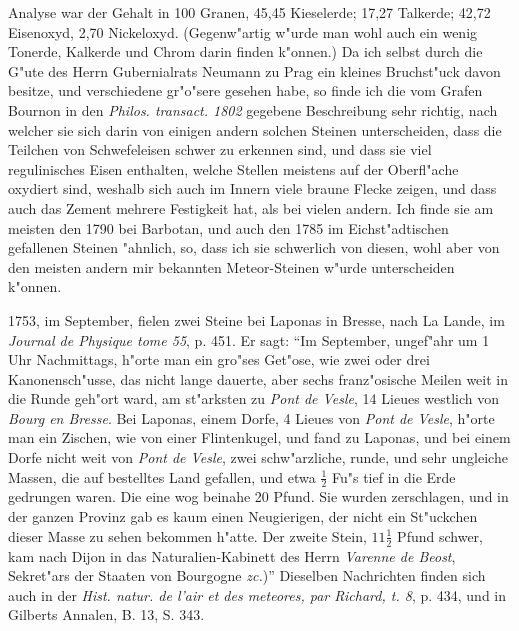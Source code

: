 \documentclass[a4paper, 11pt, oneside, polutonikogreek, german]{article}
\begin{document}
Analyse war der Gehalt in 100 Granen, 45,45 Kieselerde; 17,27 Talkerde; 42,72 Eisenoxyd, 2,70 Nickeloxyd. (Gegenw"artig w"urde man wohl auch ein wenig Tonerde, Kalkerde und Chrom darin finden k"onnen.) Da ich selbst durch die G"ute des Herrn Gubernialrats Neumann zu Prag ein kleines Bruchst"uck davon besitze, und verschiedene gr"o"sere gesehen habe, so finde ich die vom Grafen Bournon in den \emph{Philos. transact. 1802} gegebene Beschreibung sehr richtig, nach welcher sie sich darin von einigen andern solchen Steinen unterscheiden, dass die Teilchen von Schwefeleisen schwer zu erkennen sind, und dass sie viel regulinisches Eisen enthalten, welche Stellen meistens auf der Oberfl"ache oxydiert sind, weshalb sich auch im Innern viele braune Flecke zeigen, und dass auch das Zement mehrere Festigkeit hat, als bei vielen andern. Ich finde sie am meisten den 1790 bei Barbotan, und auch den 1785 im Eichst"adtischen gefallenen Steinen "ahnlich, so, dass ich sie schwerlich von diesen, wohl aber von den meisten andern mir bekannten Meteor-Steinen w"urde unterscheiden k"onnen.

1753, im September, fielen zwei Steine bei Laponas in Bresse, nach La Lande, im \emph{Journal de Physique tome 55}, p. 451. Er sagt: "`Im September, ungef"ahr um 1 Uhr Nachmittags, h"orte man ein gro"ses Get"ose, wie zwei oder drei Kanonensch"usse, das nicht lange dauerte, aber sechs franz"osische Meilen weit in die Runde geh"ort ward, am st"arksten zu \emph{Pont de Vesle}, 14 Lieues westlich von \emph{Bourg en Bresse}. Bei Laponas, einem Dorfe, 4 Lieues von \emph{Pont de Vesle}, h"orte man ein Zischen, wie von einer Flintenkugel, und fand zu Laponas, und bei einem Dorfe nicht weit von \emph{Pont de Vesle}, zwei schw"arzliche, runde, und sehr ungleiche Massen, die auf bestelltes Land gefallen, und etwa $\mathfrak{\frac{1}{2}}$ Fu"s tief in die Erde gedrungen waren. Die eine wog beinahe 20 Pfund. Sie wurden zerschlagen, und in der ganzen Provinz gab es kaum einen Neugierigen, der nicht ein St"uckchen dieser Masse zu sehen bekommen h"atte. Der zweite Stein, $\mathfrak{11\frac{1}{2}}$ Pfund schwer, kam nach Dijon in das Naturalien-Kabinett des Herrn \emph{Varenne de Beost}, Sekret"ars der Staaten von Bourgogne \emph{zc.})"' Dieselben Nachrichten finden sich auch in der \emph{Hist. natur. de l'air et des meteores, par Richard, t. 8}, p. 434, und in Gilberts Annalen, B. 13, S. 343.
\end{document}
